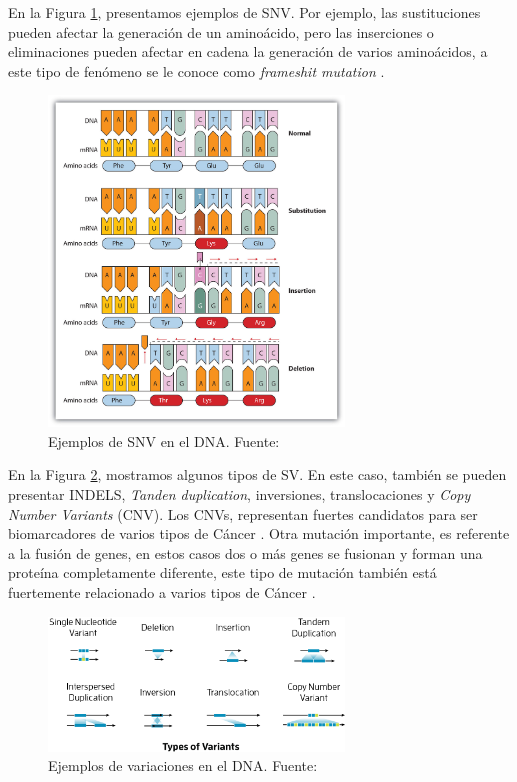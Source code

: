En la Figura \ref{fig:SNV}, presentamos ejemplos de SNV. Por ejemplo, las sustituciones pueden afectar la generación de un aminoácido, pero las inserciones o eliminaciones pueden afectar en cadena la generación de varios aminoácidos, a este tipo de fenómeno se le conoce como \textit{frameshit mutation} \citep{xu2018review}.


\begin{figure}[h]
	\centering
	\includegraphics[width=0.7\textwidth]{../img/neoantigen/SNV}
	\caption{Ejemplos de SNV en el DNA. Fuente: \cite{socrates2022}}
	\label{fig:SNV}
\end{figure}

En la Figura \ref{fig:variants}, mostramos algunos tipos de SV. En este caso, también se pueden presentar INDELS, \textit{Tanden duplication}, inversiones, translocaciones y \textit{Copy Number Variants} (CNV). Los CNVs, representan fuertes candidatos para ser biomarcadores de varios tipos de Cáncer \citep{pan2019identification, lucito2007copy}. Otra mutación importante, es referente a la fusión de genes, en estos casos dos o más genes se fusionan y forman una proteína completamente diferente, este tipo de mutación también está fuertemente relacionado a varios tipos de Cáncer \citep{kerbs2022fusion, kim2019fusiongdb, heyer2020sequencing}.

\begin{figure}[h]
	\centering
	\includegraphics[width=0.7\textwidth]{../img/neoantigen/variants}
	\caption{Ejemplos de variaciones en el DNA. Fuente: \cite{sv_pacbio_2021}}
	\label{fig:variants}
\end{figure}


